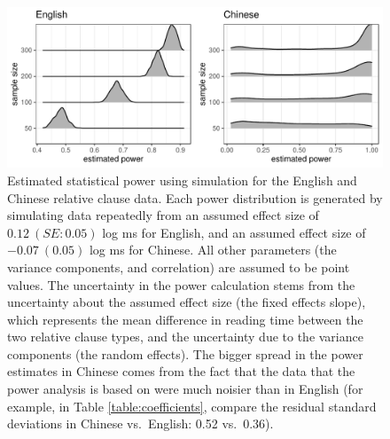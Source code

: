 \documentclass{ar-1col}\usepackage[]{graphicx}\usepackage[]{color}
\makeatletter
\def\maxwidth{ %
  \ifdim\Gin@nat@width>\linewidth
    \linewidth
  \else
    \Gin@nat@width
  \fi
}
\newenvironment{knitrout}{}{} %
\makeatother
\begin{document}
\begin{figure}[!htbp]
\centering
\begin{knitrout}
\color{fgcolor}

{\centering \includegraphics[width=\maxwidth]{figures/fig-unnamed-chunk-11-1} 

}


\end{knitrout}
\caption{Estimated statistical power using simulation for the English and Chinese relative clause data. Each power distribution is generated by simulating data repeatedly from an assumed effect size of $0.12~(SE: 0.05)$ log ms for English, and an assumed effect size of $-0.07~(0.05)$ log ms for Chinese. All other parameters (the variance components, and correlation) are assumed to be point values. The uncertainty in the power calculation stems from the uncertainty about the assumed effect size (the fixed effects slope), which represents the mean difference in reading time between the two relative clause types, and the uncertainty due to the variance components (the random effects). The bigger spread in the power estimates in Chinese comes from the fact that the data that the power analysis is based on were much noisier than in English (for example, in Table \ref{table:coefficients}, compare the residual standard deviations in Chinese vs.\ English: 0.52 vs.\ 0.36).}\label{fig:powerEN}
\end{figure}



\end{document}
